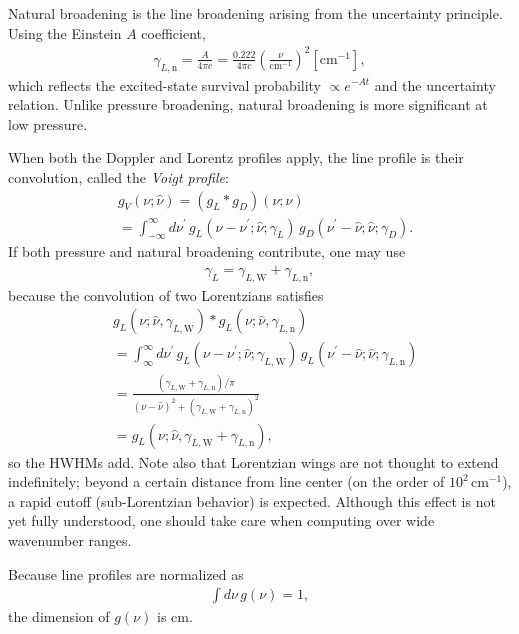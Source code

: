 Natural broadening is the line broadening arising from the uncertainty principle. Using the Einstein $A$ coefficient,
\begin{eqnarray}
\gamma_{L, \mathrm{n}} = \frac{A}{4 \pi c} = \frac{0.222}{4 \pi c} \left( \frac{\nu}{\mathrm{cm^{-1}}} \right)^2 \mathrm{[cm^{-1}]},
\end{eqnarray}
which reflects the excited-state survival probability $\propto e^{-A t}$ and the uncertainty relation. Unlike pressure broadening, natural broadening is more significant at low pressure.

When both the Doppler and Lorentz profiles apply, the line profile is their convolution, called the \emph{Voigt profile}:
\begin{align}
&g_V(\nu;\hat{\nu}) = ( g_L \ast g_D )(\nu; \hat{\nu}) \nonumber \\
&= \int_{-\infty}^\infty \! d \nu^\prime \,
g_L(\nu - \nu^\prime;\hat{\nu};\gamma_L)\,
g_D(\nu^\prime - \hat{\nu};\hat{\nu};\gamma_D).
\label{eq:voigt}
\end{align}
If both pressure and natural broadening contribute, one may use
\begin{eqnarray}
\label{eq:sumgamma}
\gamma_L = \gamma_{L, \mathrm{W}} + \gamma_{L, \mathrm{n}},
\end{eqnarray}
because the convolution of two Lorentzians satisfies
\begin{align}
&g_L(\nu;\hat{\nu},\gamma_{L,\mathrm{W}}) \ast g_L(\nu;\hat{\nu},\gamma_{L,\mathrm{n}}) \nonumber \\
&= \int_\infty^\infty \! d \nu^\prime \,
g_L(\nu - \nu^\prime;\hat{\nu};\gamma_{L,\mathrm{W}})\,
g_L(\nu^\prime - \hat{\nu};\hat{\nu};\gamma_{L,\mathrm{n}}) \\
&= \frac{(\gamma_{L,\mathrm{W}}+\gamma_{L,\mathrm{n}})/\pi}{(\nu - \hat{\nu})^2  + (\gamma_{L,\mathrm{W}}+\gamma_{L,\mathrm{n}})^2} \nonumber \\
&= g_L(\nu;\hat{\nu},\gamma_{L,\mathrm{W}}+\gamma_{L,\mathrm{n}}),
\label{eq:voigt2}
\end{align}
so the HWHMs add. Note also that Lorentzian wings are not thought to extend indefinitely; beyond a certain distance from line center (on the order of $10^2\,\mathrm{cm^{-1}}$), a rapid cutoff (sub-Lorentzian behavior) is expected. Although this effect is not yet fully understood, one should take care when computing over wide wavenumber ranges.

Because line profiles are normalized as
\begin{align}
\int d \nu \, g(\nu) = 1,
\end{align}
the dimension of $g(\nu)$ is $\mathrm{cm}$.

